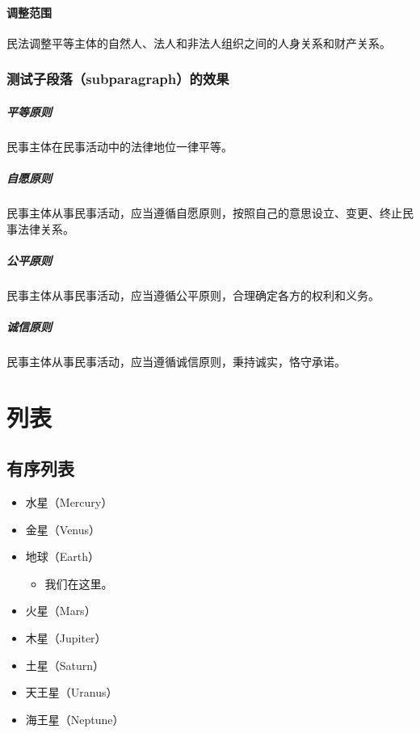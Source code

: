 \paragraph{调整范围} 
民法调整平等主体的自然人、法人和非法人组织之间的人身关系和财产关系。

\subsubsection{测试子段落（subparagraph）的效果}

\subparagraph{平等原则} 
民事主体在民事活动中的法律地位一律平等。

\subparagraph{自愿原则} 
民事主体从事民事活动，应当遵循自愿原则，按照自己的意思设立、变更、终止民事法律关系。

\subparagraph{公平原则}
民事主体从事民事活动，应当遵循公平原则，合理确定各方的权利和义务。

\subparagraph{诚信原则}
民事主体从事民事活动，应当遵循诚信原则，秉持诚实，恪守承诺。

\section{列表}

\subsection{有序列表}
\begin{itemize}
    \item 水星（Mercury）
    \item 金星（Venus）
    \item 地球（Earth）
    \begin{itemize}
        \item 我们在这里。
    \end{itemize}
    \item 火星（Mars）
    \item 木星（Jupiter）
    \item 土星（Saturn）
    \item 天王星（Uranus）
    \item 海王星（Neptune）
\end{itemize}

